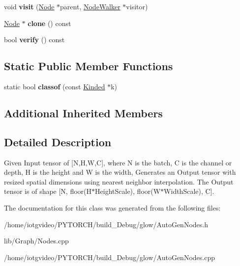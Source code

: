 \begin{DoxyCompactItemize}
\mbox{\label{classglow_1_1_resize_nearest_node_a91fe374ac9230aa7ba36b690d8e467f1}} 
void {\bfseries visit} (\hyperlink{classglow_1_1_node}{Node} $\ast$parent, \hyperlink{classglow_1_1_node_walker}{Node\+Walker} $\ast$visitor)
\item 
\mbox{\label{classglow_1_1_resize_nearest_node_a94d2290aef6f5a2b71409c3f1ca419e6}} 
\hyperlink{classglow_1_1_node}{Node} $\ast$ {\bfseries clone} () const
\item 
\mbox{\label{classglow_1_1_resize_nearest_node_a31f6cdcf96b9221cce02a44cbc7ae2cf}} 
bool {\bfseries verify} () const
\end{DoxyCompactItemize}
\subsection*{Static Public Member Functions}
\begin{DoxyCompactItemize}
\item 
\mbox{\label{classglow_1_1_resize_nearest_node_a64e05f522c711f2224be4ea332169b8e}} 
static bool {\bfseries classof} (const \hyperlink{classglow_1_1_kinded}{Kinded} $\ast$k)
\end{DoxyCompactItemize}
\subsection*{Additional Inherited Members}


\subsection{Detailed Description}
Given Input tensor of \mbox{[}N,H,W,C\mbox{]}, where N is the batch, C is the channel or depth, H is the height and W is the width, Generates an Output tensor with resized spatial dimensions using nearest neighbor interpolation. The Output tensor is of shape \mbox{[}N, floor(\+H$\ast$\+Height\+Scale), floor(\+W$\ast$\+Width\+Scale), C\mbox{]}. 

The documentation for this class was generated from the following files\+:\begin{DoxyCompactItemize}
\item 
/home/iotgvideo/\+P\+Y\+T\+O\+R\+C\+H/build\+\_\+\+Debug/glow/Auto\+Gen\+Nodes.\+h\item 
lib/\+Graph/Nodes.\+cpp\item 
/home/iotgvideo/\+P\+Y\+T\+O\+R\+C\+H/build\+\_\+\+Debug/glow/Auto\+Gen\+Nodes.\+cpp\end{DoxyCompactItemize}
